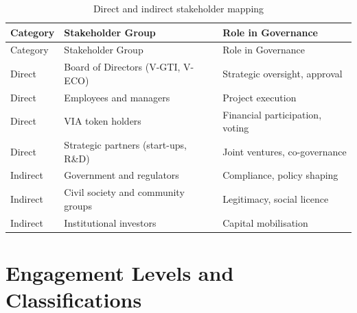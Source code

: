 \documentclass[
  english,
  12pt,
  oneside,
  open=any]{scrbook}
\begin{document}
\begin{longtable}[]{@{}
  >{\raggedright\arraybackslash}p{}
  >{\raggedright\arraybackslash}p{}
  >{\raggedright\arraybackslash}p{}@{}}
\caption{Direct and indirect stakeholder
mapping}\label{tbl-stakeholders}\tabularnewline
\toprule\noalign{}
\begin{minipage}[b]{\linewidth}\raggedright
Category
\end{minipage} & \begin{minipage}[b]{\linewidth}\raggedright
Stakeholder Group
\end{minipage} & \begin{minipage}[b]{\linewidth}\raggedright
Role in Governance
\end{minipage} \\
\midrule\noalign{}
\endfirsthead
\toprule\noalign{}
\begin{minipage}[b]{\linewidth}\raggedright
Category
\end{minipage} & \begin{minipage}[b]{\linewidth}\raggedright
Stakeholder Group
\end{minipage} & \begin{minipage}[b]{\linewidth}\raggedright
Role in Governance
\end{minipage} \\
\midrule\noalign{}
\endhead
\bottomrule\noalign{}
\endlastfoot
Direct & Board of Directors (V-GTI, V-ECO) & Strategic oversight,
approval \\
Direct & Employees and managers & Project execution \\
Direct & VIA token holders & Financial participation, voting \\
Direct & Strategic partners (start-ups, R\&D) & Joint ventures,
co-governance \\
Indirect & Government and regulators & Compliance, policy shaping \\
Indirect & Civil society and community groups & Legitimacy, social
licence \\
Indirect & Institutional investors & Capital mobilisation \\
\end{longtable}

\section{Engagement Levels and Classifications}\label{sec-engage-levels}
\end{document}
